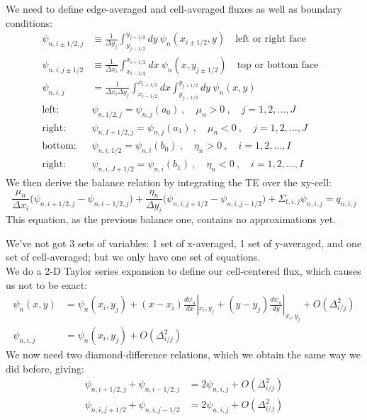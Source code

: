 \documentclass[12pt]{article}
\begin{document}
We need to define edge-averaged and cell-averaged fluxes as well as boundary conditions:
\begin{align*}
\psi_{n,i\pm1/2,j} &\equiv \frac{1}{\Delta y_{j}} \int_{y_{j-1/2}}^{y_{j+1/2}} dy\: \psi_n(x_{i\pm1/2}, y) \quad \text{left or right face}\\
\psi_{n,i,j\pm1/2} &\equiv \frac{1}{\Delta x_{i}} \int_{x_{i-1/2}}^{x_{i+1/2}} dx\: \psi_n(x, y_{j\pm1/2}) \quad \text{top or bottom face}\\
\psi_{n,i,j} &= \frac{1}{\Delta x_i \Delta y_j} \int_{x_{i-1/2}}^{x_{i+1/2}} dx \int_{y_{j-1/2}}^{y_{j+1/2}} dy\: \psi_n(x,y)
&\\
\text{left: }\:&\psi_{n,1/2,j} = \psi_{n,j}(a_0)\:, \quad \mu_n > 0\:, \quad j = 1, 2, \dots, J \\
\text{right: }\:&\psi_{n,I+1/2,j} = \psi_{n,j}(a_1)\:, \quad \mu_n < 0\:, \quad j = 1, 2, \dots, J \\
\text{bottom: }\:&\psi_{n,i,1/2} = \psi_{n,i}(b_0)\:, \quad \eta_n > 0\:, \quad i = 1, 2, \dots, I \\
\text{right: }\:&\psi_{n,i,J+1/2} = \psi_{n,i}(b_1)\:, \quad \eta_n < 0\:, \quad i = 1, 2, \dots, I 
\end{align*}
%
We then derive the balance relation by integrating the TE over the xy-cell:
\[
\frac{\mu_n}{\Delta x_i}\bigl(\psi_{n,i+1/2,j} - \psi_{n,i-1/2,j}\bigr) + \frac{\eta_n}{\Delta y_i}\bigl(\psi_{n,i,j+1/2} - \psi_{n,i,j-1/2}\bigr) + \Sigma_{t,i,j} \psi_{n,i,j} = q_{n,i,j} 
\]
This equation, as the previous balance one, contains no approximations yet. 


We've not got 3 sets of variables: 1 set of x-averaged, 1 set of y-averaged, and one set of cell-averaged; but we only have one set of equations.\\
We do a 2-D Taylor series expansion to define our cell-centered flux, which causes us not to be exact:
\begin{align*}
\psi_n(x,y) &= \psi_n(x_i,y_j) + (x-x_i)\frac{d\psi_n}{dx}|_{x_i,y_j} + (y-y_j)\frac{d\psi_n}{dy}|_{x_i,y_j} + O(\Delta_{i/j}^2)\\
\psi_{n,i,j} &= \psi_n(x_i,y_j) + O(\Delta_{i/j}^2)
\end{align*}
We now need two diamond-difference relations, which we obtain the same way we did before, giving:
\begin{align*}
\psi_{n,i+1/2,j} + \psi_{n,i-1/2,j} &= 2\psi_{n,i,j} + O(\Delta_{i/j}^2)\\
\psi_{n,i,j+1/2} + \psi_{n,i,j-1/2} &= 2\psi_{n,i,j} + O(\Delta_{i/j}^2)
\end{align*}
\end{document}
